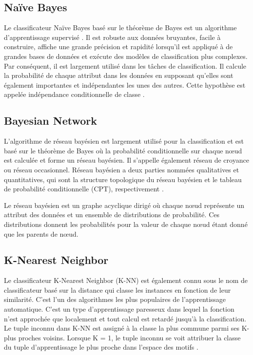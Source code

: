 \subsection{Naïve Bayes}
Le classificateur Naïve Bayes \cite{Bayesian} basé sur le théorème de Bayes est un algorithme d'apprentissage supervisé \cite{DefectPred}. Il est robuste aux données bruyantes, facile à construire, affiche une grande précision et rapidité lorsqu'il est appliqué à de grandes bases de données et exécute des modèles de classification plus complexes. Par conséquent, il est largement utilisé dans les tâches de classification. Il calcule la probabilité de chaque attribut dans les données en supposant qu'elles sont également importantes et indépendantes les unes des autres. Cette hypothèse est appelée indépendance conditionnelle de classe \cite{KMean_DT} \cite{QUAIL}.

\subsection{Bayesian Network}
L'algorithme de réseau bayésien est largement utilisé pour la classification et est basé sur le théorème de Bayes où la probabilité conditionnelle sur chaque nœud est calculée et forme un réseau bayésien. Il s'appelle également réseau de croyance ou réseau occasionnel. Réseau bayésien a deux parties nommées qualitatives et quantitatives, qui sont la structure topologique du réseau bayésien et le tableau de probabilité conditionnelle (CPT), respectivement \cite{Bayesian01}.

Le réseau bayésien est un graphe acyclique dirigé où chaque nœud représente un attribut des données et un ensemble de distributions de probabilité. Ces distributions donnent les probabilités pour la valeur de chaque nœud étant donné que les parents de nœud.

\subsection{K-Nearest Neighbor}
Le classificateur K-Nearest Neighbor (K-NN) \cite{ML00} est également connu sous le nom de classificateur basé sur la distance qui classe les instances en fonction de leur similarité. C'est l'un des algorithmes les plus populaires de l'apprentissage automatique. C'est un type d'apprentissage paresseux dans lequel la fonction n'est approchée que localement et tout calcul est retardé jusqu'à la classification. Le tuple inconnu dans K-NN est assigné à la classe la plus commune parmi ses K-plus proches voisins. Lorsque K = 1, le tuple inconnu se voit attribuer la classe du tuple d'apprentissage le plus proche dans l'espace des motifs \cite{ML01}.


